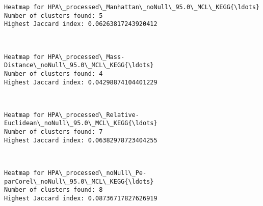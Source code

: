 \documentclass[11pt]{article}
\begin{document}
    \begin{Verbatim}[commandchars=\\\{\}]
Heatmap for HPA\_processed\_Manhattan\_noNull\_95.0\_MCL\_KEGG{\ldots}
Number of clusters found: 5
Highest Jaccard index: 0.06263817243920412

    \end{Verbatim}

    \begin{center}
    \end{center}
    { \hspace*{\fill} \\}
    
    \begin{Verbatim}[commandchars=\\\{\}]
Heatmap for HPA\_processed\_Mass-Distance\_noNull\_95.0\_MCL\_KEGG{\ldots}
Number of clusters found: 4
Highest Jaccard index: 0.04298874104401229

    \end{Verbatim}

    \begin{center}
    \end{center}
    { \hspace*{\fill} \\}
    
    \begin{Verbatim}[commandchars=\\\{\}]
Heatmap for HPA\_processed\_Relative-Euclidean\_noNull\_95.0\_MCL\_KEGG{\ldots}
Number of clusters found: 7
Highest Jaccard index: 0.06382978723404255

    \end{Verbatim}

    \begin{center}
    \end{center}
    { \hspace*{\fill} \\}
    
    \begin{Verbatim}[commandchars=\\\{\}]
Heatmap for HPA\_processed\_noNull\_Pe-parCorel\_noNull\_95.0\_MCL\_KEGG{\ldots}
Number of clusters found: 8
Highest Jaccard index: 0.08736717827626919

    \end{Verbatim}
\end{document}
